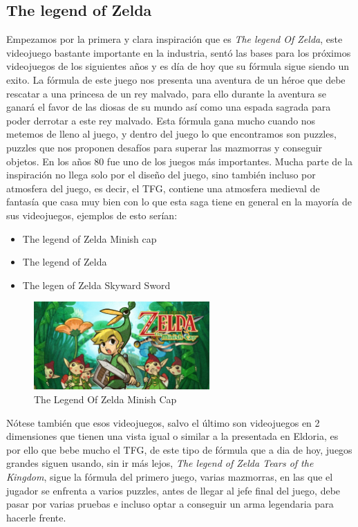\documentclass[a4paper]{article}
\begin{document}
\begin{appendices}
    \subsection{The legend of Zelda}
    Empezamos por la primera y clara inspiración que es \textit{The legend Of Zelda}, este videojuego bastante importante en la industria, sentó las bases para los próximos videojuegos de los siguientes años
    y es día de hoy que su fórmula sigue siendo un exito. La fórmula de este juego nos presenta una aventura de un héroe que debe rescatar a una princesa de un rey malvado, para ello durante la aventura se ganará
    el favor de las diosas de su mundo así como una espada sagrada para poder derrotar a este rey malvado. Esta fórmula gana mucho cuando nos metemos de lleno al juego, y dentro del juego lo que encontramos son puzzles,
    puzzles que nos proponen desafíos para superar las mazmorras y conseguir objetos. En los años 80 fue uno de los juegos más importantes. Mucha parte de la inspiración no llega solo por el diseño del juego, sino también
    incluso por atmosfera del juego, es decir, el TFG, contiene una atmosfera medieval de fantasía que casa muy bien con lo que esta saga tiene en general en la mayoría de sus videojuegos, ejemplos de esto serían:
    \begin{itemize}
        \item The legend of Zelda Minish cap
        \item The legend of Zelda
        \item The legen of Zelda Skyward Sword
    \end{itemize}

    \begin{figure}[ht]
        \centering
        \includegraphics[width=0.6\textwidth]{Images/SI_GBA_TheLegendOfZeldaTheMinishCap_image1600w.jpg}
        \caption{The Legend Of Zelda Minish Cap}
        \label{fig:Zelda}
    \end{figure}

    Nótese también que esos videojuegos, salvo el último son videojuegos en 2 dimensiones que tienen una vista igual o similar a la presentada en Eldoria, es por ello que bebe mucho el TFG, de este tipo de fórmula que
    a dia de hoy, juegos grandes siguen usando, sin ir más lejos, \textit{The legend of Zelda Tears of the Kingdom}, sigue la fórmula del primero juego, varias mazmorras, en las que el jugador se enfrenta a varios puzzles,
    antes de llegar al jefe final del juego, debe pasar por varias pruebas e incluso optar a conseguir un arma legendaria para hacerle frente.


\end{appendices}
\end{document}
